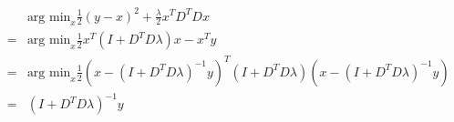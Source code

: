 \documentclass{article}
\begin{document}
\begin{eqnarray}
&&\textrm{arg min}_x \frac{1}{2}(y-x)^2+\frac{\lambda}{2}x^TD^TDx\nonumber\\
&=&\textrm{arg min}_x \frac{1}{2}x^T(I+D^TD\lambda)x-x^Ty\nonumber\\
&=&\textrm{arg min}_x\frac{1}{2}(x-(I+D^TD\lambda)^{-1}y)^T(I+D^TD\lambda)(x-(I+D^TD\lambda)^{-1}y)\nonumber\\
&=&(I+D^TD\lambda)^{-1}y
\end{eqnarray}
\end{document}
